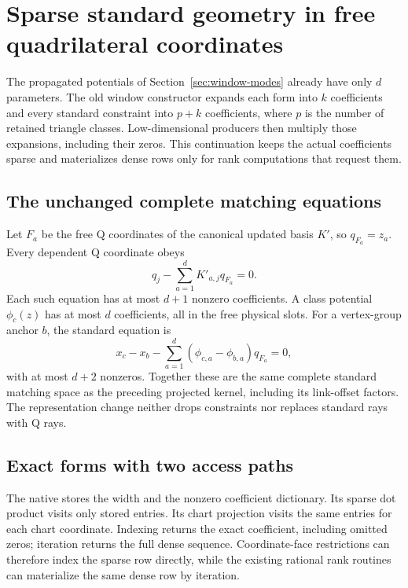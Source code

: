 \section{Sparse standard geometry in free quadrilateral coordinates}
\label{sec:window-geometry}

The propagated potentials of Section~\ref{sec:window-modes} already have
only $d$ parameters. The old window constructor expands each form into
$k$ coefficients and every standard constraint into $p+k$ coefficients,
where $p$ is the number of retained triangle classes. Low-dimensional
producers then multiply those expansions, including their zeros. This
continuation keeps the actual coefficients sparse and materializes dense
rows only for rank computations that request them.

\subsection{The unchanged complete matching equations}

Let $F_a$ be the free Q coordinates of the canonical updated basis $K'$,
so $q_{F_a}=z_a$. Every dependent Q coordinate obeys
\[
                 q_j-\sum_{a=1}^d K'_{a,j}q_{F_a}=0.
\]
Each such equation has at most $d+1$ nonzero coefficients. A class potential
$\phi_c(z)$ has at most $d$ coefficients, all in the free physical slots.
For a vertex-group anchor $b$, the standard equation is
\[
 x_c-x_b-\sum_{a=1}^d(\phi_{c,a}-\phi_{b,a})q_{F_a}=0,
\]
with at most $d+2$ nonzeros. Together these are the same complete standard
matching space as the preceding projected kernel, including its link-offset
factors. The representation change neither drops constraints nor replaces
standard rays with Q rays.

\subsection{Exact forms with two access paths}

The native  stores the width and the nonzero
coefficient dictionary. Its sparse dot product visits only stored entries.
Its chart projection visits the same entries for each chart coordinate.
Indexing returns the exact coefficient, including omitted zeros; iteration
returns the full dense sequence. Coordinate-face restrictions can therefore
index the sparse row directly, while the existing rational rank routines
can materialize the same dense row by iteration.

